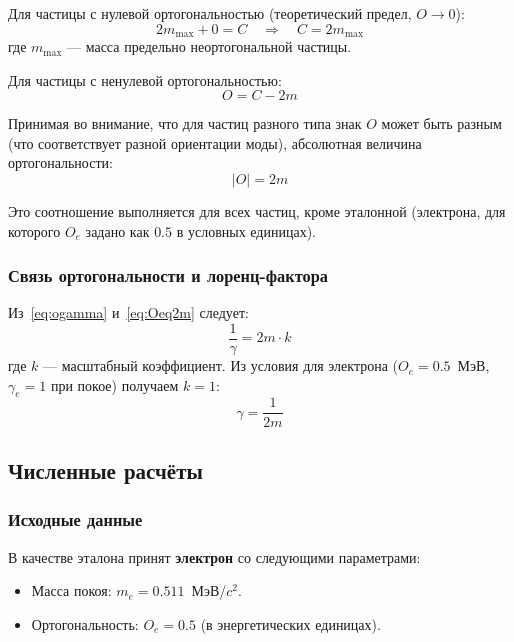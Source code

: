 \documentclass[12pt,a4paper]{article}
\begin{document}
Для частицы с нулевой ортогональностью (теоретический предел, $O \to 0$):
\begin{equation}
    2m_{\max} + 0 = C \quad \Rightarrow \quad C = 2m_{\max}
\end{equation}
где $m_{\max}$ --- масса предельно неортогональной частицы.

Для частицы с ненулевой ортогональностью:
\begin{equation}
    O = C - 2m
    \label{eq:OfromC}
\end{equation}

Принимая во внимание, что для частиц разного типа знак $O$ может быть разным (что соответствует разной ориентации моды), абсолютная величина ортогональности:
\begin{equation}
    \boxed{|O| = 2m}
    \label{eq:Oeq2m}
\end{equation}

Это соотношение выполняется для всех частиц, кроме эталонной (электрона, для которого $O_e$ задано как $0.5$ в условных единицах).

\subsubsection{Связь ортогональности и лоренц-фактора}
Из~\eqref{eq:ogamma} и~\eqref{eq:Oeq2m} следует:
\begin{equation}
    \frac{1}{\gamma} = 2m \cdot k
\end{equation}
где $k$ --- масштабный коэффициент. Из условия для электрона ($O_e = 0.5$~МэВ, $\gamma_e = 1$ при покое) получаем $k = 1$:
\begin{equation}
    \boxed{\gamma = \frac{1}{2m}}
    \label{eq:gammafromm}
\end{equation}

\subsection{Численные расчёты}

\subsubsection{Исходные данные}
В качестве эталона принят \textbf{электрон} со следующими параметрами:
\begin{itemize}
    \item Масса покоя: $m_e = 0.511$~МэВ/$c^2$.
    \item Ортогональность: $O_e = 0.5$ (в энергетических единицах).
\end{itemize}
\end{document}
